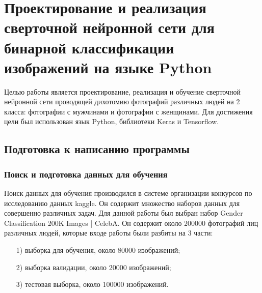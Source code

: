 \chapter{Проектирование и реализация сверточной нейронной сети для бинарной классификации изображений на языке Python}
Целью работы является проектирование, реализация и обучение сверточной нейронной сети проводящей дихотомию фотографий различных людей на 2 класса: фотографии с мужчинами и фотографии с женщинами. Для достижения цели был использован язык Python, библиотеки Keras и Tensorflow.
\section{Подготовка к написанию программы}
\subsection{Поиск и подготовка данных для обучения}
Поиск данных для обучения производился в системе организации конкурсов по исследованию данных kaggle. Он содержит множество наборов данных для совершенно различных задач. Для данной работы был выбран набор Gender Classification 200K Images | CelebA. Он содержит около 200000 фотографий лиц различных людей, которые входе работы были разбиты на 3 части:
\begin{enumerate}
    \item [1)] выборка для обучения, около 80000 изображений;
    \item [2)] выборка валидации, около 20000 изображений;
    \item [3)] тестовая выборка, около 100000 изображений.
\end{enumerate}

